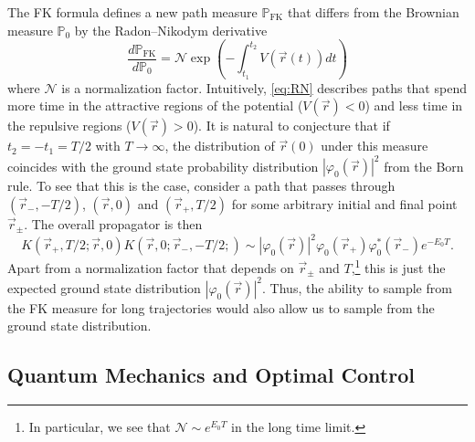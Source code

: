 \documentclass[12pt]{msml2020} %
\begin{document}
The FK formula defines a new path measure $\mathbb{P}_\text{FK}$ that differs from the Brownian measure $\mathbb{P}_0$ by the Radon--Nikodym derivative
%
\begin{equation}\label{eq:RN}
  \frac{d\mathbb{P}_\text{FK}}{d\mathbb{P}_0} = \mathcal{N}\exp\left(-\int_{t_1}^{t_2}V(\vec{r}(t))dt\right)
\end{equation}
%
where $\mathcal{N}$ is a normalization factor. Intuitively, \eqref{eq:RN} describes paths that spend more time in the attractive regions of the potential ($V(\vec{r})<0$) and less time in the repulsive regions ($V(\vec{r})>0$). It is natural to conjecture that if $t_2=-t_1=T/2$ with $T\to\infty$, the distribution of $\vec{r}(0)$ under this measure  coincides with the ground state probability distribution  $|\varphi_0(\vec{r})|^2$ from the Born rule. To see that this is the case, consider a path that passes through $(\vec{r}_-,-T/2)$, $(\vec{r},0)$ and $(\vec{r}_+,T/2)$ for some arbitrary initial and final point $\vec{r}_\pm$. The overall propagator is then
%
\begin{equation}
  K(\vec{r}_+,T/2;\vec{r},0)K(\vec{r},0;\vec{r}_-,-T/2;)\sim  |\varphi_0(\vec{r})|^2\varphi_0(\vec{r}_+)\varphi^*_0(\vec{r}_-)e^{-E_0T}.
\end{equation}
%
Apart from a normalization factor that depends on $\vec{r}_\pm$ and $T$,\footnote{In particular, we see that $\mathcal{N}\sim e^{E_0 T}$ in the long time limit.} this is just the expected ground state distribution $|\varphi_0(\vec{r})|^2$. Thus, the ability to sample from the FK measure for long trajectories would also allow us to sample from the ground state distribution.

\subsection{Quantum Mechanics and Optimal Control}
\end{document}
